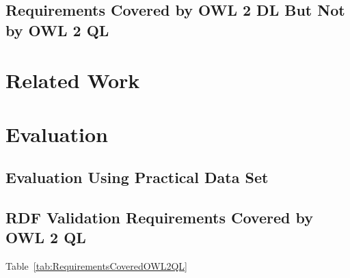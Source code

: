 \documentclass{llncs}
\begin{document}
\subsection{Requirements Covered by OWL 2 DL But Not by OWL 2 QL}



\section{Related Work}



\section{Evaluation}



\subsection{Evaluation Using Practical Data Set}



\subsection{RDF Validation Requirements Covered by OWL 2 QL}

Table~\ref{tab:RequirementsCoveredOWL2QL}
\end{document}
